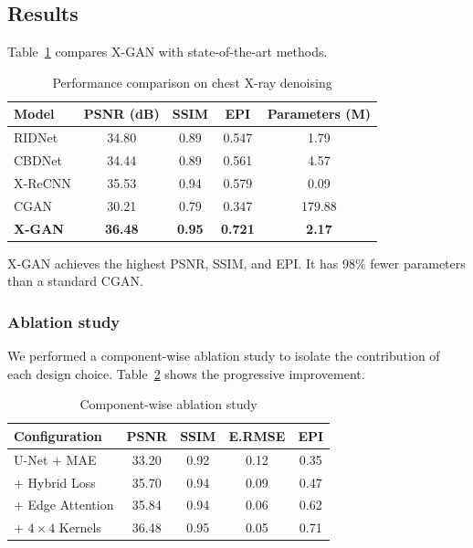 \subsection{Results}

Table~\ref{tab:xgan} compares X-GAN with state-of-the-art methods.

\begin{table}[H]
	\centering
	\caption{Performance comparison on chest X-ray denoising}
	\label{tab:xgan}
	\begin{tabular}{lcccc}
		\toprule
		Model & PSNR (dB) & SSIM & EPI & Parameters (M) \\
		\midrule
		RIDNet & 34.80 & 0.89 & 0.547 & 1.79 \\
		CBDNet & 34.44 & 0.89 & 0.561 & 4.57 \\
		X-ReCNN & 35.53 & 0.94 & 0.579 & 0.09 \\
		CGAN & 30.21 & 0.79 & 0.347 & 179.88 \\
		\textbf{X-GAN} & \textbf{36.48} & \textbf{0.95} & \textbf{0.721} & \textbf{2.17} \\
		\bottomrule
	\end{tabular}
\end{table}

X-GAN achieves the highest PSNR, SSIM, and EPI. It has 98\% fewer parameters than a standard CGAN.

\subsubsection{Ablation study}

We performed a component-wise ablation study to isolate the contribution of each design choice. Table~\ref{tab:xgan_ablation} shows the progressive improvement.

\begin{table}[H]
	\centering
	\caption{Component-wise ablation study}
	\label{tab:xgan_ablation}
	\begin{tabular}{lcccc}
		\toprule
		Configuration & PSNR & SSIM & E.RMSE & EPI \\
		\midrule
		U-Net + MAE & 33.20 & 0.92 & 0.12 & 0.35 \\
		+ Hybrid Loss & 35.70 & 0.94 & 0.09 & 0.47 \\
		+ Edge Attention & 35.84 & 0.94 & 0.06 & 0.62 \\
		+ \(4 \times 4\) Kernels & 36.48 & 0.95 & 0.05 & 0.71 \\
		\bottomrule
	\end{tabular}
\end{table}


